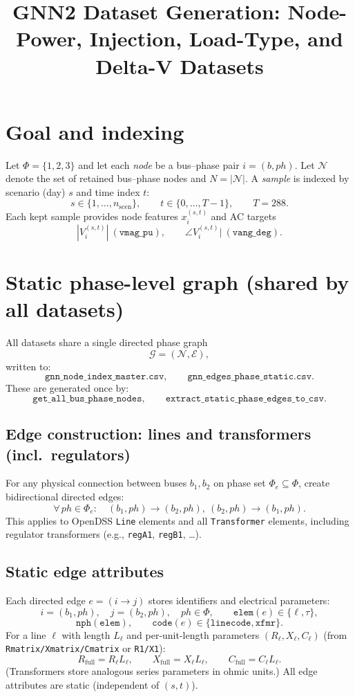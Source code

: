 \documentclass[11pt]{article}
\title{GNN2 Dataset Generation: Node-Power, Injection, Load-Type, and Delta-V Datasets}
\author{}
\date{}
\begin{document}
\maketitle
\tableofcontents
\newpage

\section{Goal and indexing}

Let $\Phi=\{1,2,3\}$ and let each \emph{node} be a bus--phase pair $i=(b,ph)$. Let
$\mathcal{N}$ denote the set of retained bus--phase nodes and $N=|\mathcal{N}|$.
A \emph{sample} is indexed by scenario (day) $s$ and time index $t$:
\[
s\in\{1,\dots,n_{\mathrm{scen}}\},\qquad t\in\{0,\dots,T-1\},\qquad T=288.
\]
Each kept sample provides node features $x_{i}^{(s,t)}$ and AC targets
\[
|V_i^{(s,t)}|~(\texttt{vmag\_pu}),\qquad \angle V_i^{(s,t)}|~(\texttt{vang\_deg}).
\]

\section{Static phase-level graph (shared by all datasets)}

All datasets share a single directed phase graph
\[
\mathcal{G}=(\mathcal{N},\mathcal{E}),
\]
written to:
\[
\texttt{gnn\_node\_index\_master.csv},\qquad \texttt{gnn\_edges\_phase\_static.csv}.
\]
These are generated once by:
\[
\texttt{get\_all\_bus\_phase\_nodes},\qquad \texttt{extract\_static\_phase\_edges\_to\_csv}.
\]

\subsection*{Edge construction: lines and transformers (incl.\ regulators)}

For any physical connection between buses $b_1,b_2$ on phase set $\Phi_e\subseteq\Phi$,
create bidirectional directed edges:
\[
\forall\,ph\in\Phi_e:\quad (b_1,ph)\to(b_2,ph),\ (b_2,ph)\to(b_1,ph).
\]
This applies to OpenDSS \texttt{Line} elements and all \texttt{Transformer} elements,
including regulator transformers (e.g., \texttt{regA1}, \texttt{regB1}, \dots).

\subsection*{Static edge attributes}

Each directed edge $e=(i\to j)$ stores identifiers and electrical parameters:
\[
i=(b_1,ph),\quad j=(b_2,ph),\quad ph\in\Phi,\qquad
\texttt{elem}(e)\in\{\ell,\tau\},
\]
\[
\texttt{nph}(\texttt{elem}),\qquad \texttt{code}(e)\in\{\texttt{linecode},\texttt{xfmr}\}.
\]
For a line $\ell$ with length $L_\ell$ and per-unit-length parameters $(R_\ell,X_\ell,C_\ell)$
(from \texttt{Rmatrix/Xmatrix/Cmatrix} or \texttt{R1/X1}):
\[
R_{\mathrm{full}}=R_\ell L_\ell,\qquad X_{\mathrm{full}}=X_\ell L_\ell,\qquad C_{\mathrm{full}}=C_\ell L_\ell.
\]
(Transformers store analogous series parameters in ohmic units.)
All edge attributes are static (independent of $(s,t)$).
\end{document}
